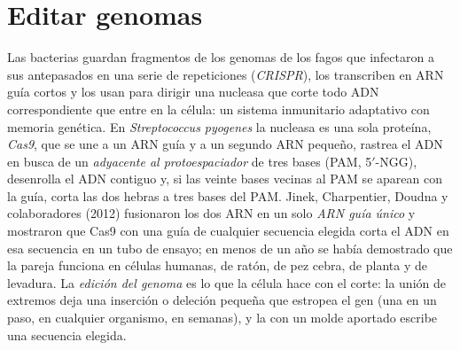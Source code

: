 \section{Editar genomas}

\begin{definition}\label{def:b3:genetic-engineering:crispr}
Las bacterias guardan fragmentos de los genomas de los fagos que
infectaron a sus antepasados en una serie de repeticiones (\emph{CRISPR}),
los transcriben en ARN guía cortos y los usan para dirigir una nucleasa
que corte todo ADN correspondiente que entre en la célula: un sistema
inmunitario adaptativo con memoria genética. En \emph{Streptococcus
pyogenes} la nucleasa es una sola proteína, \emph{Cas9}, que se une a un
ARN guía y a un segundo ARN pequeño, rastrea el ADN en busca de un
\emph{ adyacente al protoespaciador} de tres bases (PAM,
5$'$-NGG), desenrolla el ADN contiguo y, si las veinte bases vecinas al
PAM se aparean con la guía, corta las dos hebras a tres bases del PAM.
Jinek, Charpentier, Doudna y colaboradores (2012) fusionaron los dos ARN
en un solo \emph{ARN guía único} y mostraron que Cas9 con una guía de
cualquier secuencia elegida corta el ADN en esa secuencia en un tubo de
ensayo; en menos de un año se había demostrado que la pareja funciona en
células humanas, de ratón, de pez cebra, de planta y de levadura. La
\emph{edición del genoma} es lo que la célula hace con el corte: la unión
de extremos deja una inserción o deleción pequeña que estropea el gen
(una  en un paso, en cualquier organismo, en semanas), y
la  con un molde aportado escribe una secuencia
elegida.
\end{definition}


